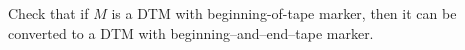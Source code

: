 Check that if $M$ is a DTM with beginning-of-tape marker,
then it can be converted to a DTM with beginning--and--end--tape
marker.
